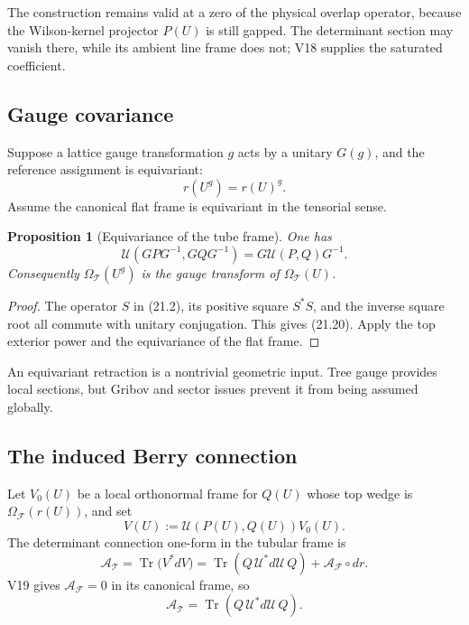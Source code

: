 \documentclass[11pt]{article}
\newtheorem{proposition}[theorem]{Proposition}
\newcommand{\Tr}{\operatorname{Tr}}
\begin{document}
The construction remains valid at a zero of the physical overlap
operator, because the Wilson-kernel projector \(P(U)\) is still gapped.
The determinant section may vanish there, while its ambient line frame
does not; V18 supplies the saturated coefficient.

\subsection{Gauge covariance}

Suppose a lattice gauge transformation \(g\) acts by a unitary
\(G(g)\), and the reference assignment is equivariant:
\[
 r(U^g)=r(U)^g.
 \tag{21.19}
\]
Assume the canonical flat frame is equivariant in the tensorial sense.

\begin{proposition}[Equivariance of the tube frame]
\label{prop:v11v21-equivariance}
One has
\[
 \mathcal U(GPG^{-1},GQG^{-1})
 =
 G\mathcal U(P,Q)G^{-1}.
 \tag{21.20}
\]
Consequently \(\Omega_{\mathcal T}(U^g)\) is the gauge transform of
\(\Omega_{\mathcal T}(U)\).
\end{proposition}

\begin{proof}
The operator \(S\) in (21.2), its positive square
\(S^*S\), and the inverse square root all commute with unitary
conjugation.  This gives (21.20).  Apply the top exterior power and the
equivariance of the flat frame.
\end{proof}

An equivariant retraction is a nontrivial geometric input.  Tree gauge
provides local sections, but Gribov and sector issues prevent it from
being assumed globally.

\subsection{The induced Berry connection}

Let \(V_0(U)\) be a local orthonormal frame for \(Q(U)\) whose top wedge is
\(\Omega_{\mathcal F}(r(U))\), and set
\[
 V(U):=\mathcal U(P(U),Q(U))V_0(U).
 \tag{21.21}
\]
The determinant connection one-form in the tubular frame is
\[
 \mathcal A_{\mathcal T}
 =
 \Tr\bigl(V^*dV\bigr)
 =
 \Tr\left(
 Q\,\mathcal U^*d\mathcal U\,Q
 \right)
 +
 \mathcal A_{\mathcal F}\circ dr.
 \tag{21.22}
\]
V19 gives \(\mathcal A_{\mathcal F}=0\) in its canonical frame, so
\[
 \mathcal A_{\mathcal T}
 =
 \Tr\left(
 Q\,\mathcal U^*d\mathcal U\,Q
 \right).
 \tag{21.23}
\]
\end{document}
